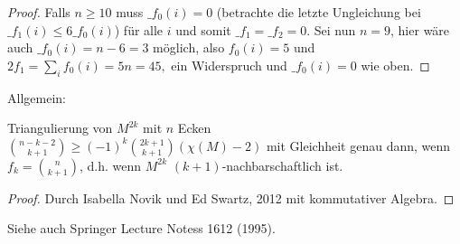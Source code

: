 \begin{st}[Kühnel, 1985]
\begin{proof}
        Falls $n \ge 10$ muss $\_f_0(i) = 0$ (betrachte die letzte Ungleichung bei $\_f_1(i) \le 6 \_f_0(i)$) für alle $i$ und somit $\_f_1 = \_f_2 = 0$.
        Sei nun $n = 9$, hier wäre auch $\_f_0(i) = n-6 = 3$ möglich, also $f_0(i) = 5$ und
        \begin{math}
            2 f_1 = \sum_{i} f_0(i) = 5n = 45,
        \end{math}
        ein Widerspruch und $\_f_0(i) = 0$ wie oben.
    \end{proof}
\end{st}

Allgemein:

\begin{conj}[Kühnel]
    Triangulierung von $M^{2k}$ mit $n$ Ecken
    \begin{math}
        \binom{n-k-2}{k+1}
        \ge (-1)^k \binom{2k+1}{k+1} (\chi(M) - 2)
    \end{math}
    mit Gleichheit genau dann, wenn $f_k = \binom{n}{k+1}$, d.h. wenn $M^{2k}$ $(k+1)$-nachbarschaftlich ist.
    \begin{proof}
        Durch Isabella Novik und Ed Swartz, 2012 mit kommutativer Algebra.
    \end{proof}
\end{conj}

Siehe auch Springer Lecture Notess 1612 (1995).


